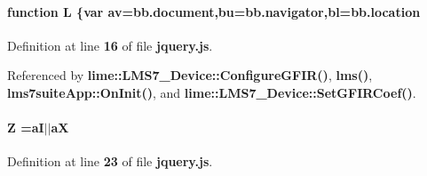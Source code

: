 \paragraph[{L}]{\setlength{\rightskip}{0pt plus 5cm}function L \{var av=bb.\+document,bu=bb.\+navigator,bl=bb.\+location}\label{soapysdr_2build_2docs_2html_2jquery_8js_a38ee4c0b5f4fe2a18d0c783af540d253}


Definition at line {\bf 16} of file {\bf jquery.\+js}.



Referenced by {\bf lime\+::\+L\+M\+S7\+\_\+\+Device\+::\+Configure\+G\+F\+I\+R()}, {\bf lms()}, {\bf lms7suite\+App\+::\+On\+Init()}, and {\bf lime\+::\+L\+M\+S7\+\_\+\+Device\+::\+Set\+G\+F\+I\+R\+Coef()}.

\paragraph[{Z}]{\setlength{\rightskip}{0pt plus 5cm}Z =aI$\vert$$\vert$aX}\label{soapysdr_2build_2docs_2html_2jquery_8js_adc18d83abfd9f87d396e8fd6b6ac0fe1}


Definition at line {\bf 23} of file {\bf jquery.\+js}.

